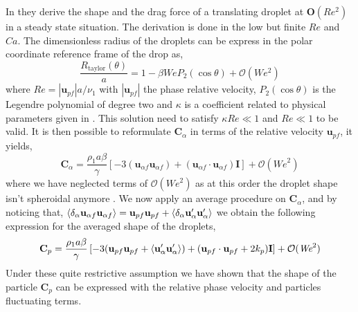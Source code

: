 In \citet{taylor1964deformation} they derive the shape and the drag force of a translating droplet at $\textbf{O}(Re^2)$ in a steady state situation. 
The derivation is done in the low but finite $Re$ and $Ca$. 
The dimensionless radius of the droplets can be express in the polar coordinate reference frame of the drop as, 
\begin{equation*}
    \frac{R_\text{taylor}(\theta)}{a} = 1 - \beta \textit{We} P_2(\cos\theta)
    + \mathcal{O}(We^2)
    \label{eq:taylor_solution}
\end{equation*}
where $Re = |\textbf{u}_{pf}| a /\nu_1$ with $|\textbf{u}_{pf}|$ the phase relative velocity, $P_2(\cos\theta)$ is the Legendre polynomial of degree two and $\kappa$ is a coefficient related to physical parameters given in \citet{taylor1964deformation}.  
This solution need to satisfy $\kappa Re \ll 1$ and $Re \ll 1$ to be valid. 
It is then possible to reformulate $\textbf{C}_\alpha$ in terms of the relative velocity $\textbf{u}_{pf}$, it yields, 
\begin{equation}
    \textbf{C}_\alpha =  \frac{ \rho_1 a \beta}{\gamma} \left[
        -  3
        (\textbf{u}_{\alpha f}\textbf{u}_{\alpha f})
        +   (\textbf{u}_{\alpha f}\cdot\textbf{u}_{\alpha f})\textbf{I}
    \right]
    + \mathcal{O}(\textit{We}^2)
\end{equation}
where we have neglected terms of $\mathcal{O}(\textit{We}^2)$ as at this order the droplet shape isn't spheroidal anymore \citet{taylor1964deformation}. 
We now apply an average procedure on $\textbf{C}_\alpha$, and by noticing that, $\left<\delta_\alpha \textbf{u}_{\alpha f}\textbf{u}_{\alpha f}\right> = \textbf{u}_{pf}\textbf{u}_{pf} + \left<\delta_\alpha \textbf{u}_\alpha'\textbf{u}_\alpha'\right>$ we obtain the following expression 
for the averaged shape of the droplets, 
\begin{equation*}
    \textbf{C}_p  =  \frac{ \rho_1 a \beta}{\gamma} \left[
        -  3
        (\textbf{u}_{p f}\textbf{u}_{p f} + \left<\textbf{u}_\alpha'\textbf{u}_\alpha'\right>)
        +   (\textbf{u}_{p f}\cdot\textbf{u}_{p f}+2k_p)\textbf{I}
    \right]
    + \mathcal{O}(\textit{We}^2)
\end{equation*}
Under these quite restrictive assumption we have shown that the shape of the particle $\textbf{C}_p$ can be expressed with the relative phase velocity and particles fluctuating terms. 

